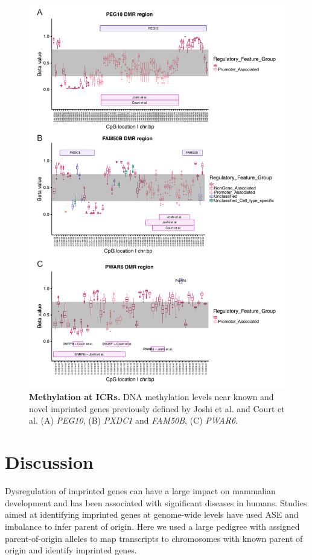 \begin{figure}[!htb]
\centering \includegraphics[width=5in]{img/ch03/fig-03.pdf}
\caption[Methylation at ICRs.]{\textbf{Methylation at ICRs.} DNA methylation levels near known and novel imprinted genes previously defined by Joshi et al. and Court et al. (A) \emph{PEG10}, (B) \emph{PXDC1} and \emph{FAM50B}, (C) \emph{PWAR6}.}
\label{fig:methylation}
\end{figure}


\section{Discussion}\label{ch03-discussion}
Dysregulation of imprinted genes can have a large impact on mammalian development and has been associated with significant diseases in humans. Studies aimed at identifying imprinted genes at genome-wide levels have used ASE and imbalance to infer parent of origin. Here we used a large pedigree with assigned parent-of-origin alleles to map transcripts to chromosomes with known parent of origin and identify imprinted genes. 

